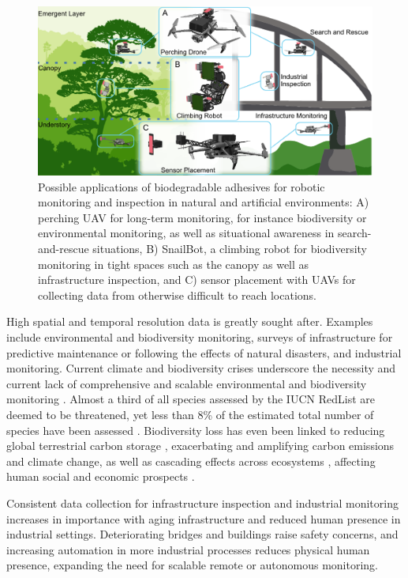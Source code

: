 \begin{figure}
  \includegraphics[width=\linewidth]{chapters/papers/SB/figures/fig-1-placeholder/fig-1-placeholder.pdf}
  \caption{Possible applications of biodegradable adhesives for robotic monitoring and inspection in natural and artificial environments: A) perching UAV for long-term monitoring, for instance biodiversity or environmental monitoring, as well as situational awareness in search-and-rescue situations, B) SnailBot, a climbing robot for biodiversity monitoring in tight spaces such as the canopy as well as infrastructure inspection, and C) sensor placement with UAVs for collecting data from otherwise difficult to reach locations.}
  \label{fig:fig1-placeholder}
\end{figure}


High spatial and temporal resolution data is greatly sought after. Examples include environmental and biodiversity monitoring, surveys of infrastructure for predictive maintenance or following the effects of natural disasters, and industrial monitoring. 
Current climate and biodiversity crises \cite{Pereira2024, Weiskopf2024, Pimm2014, Portner2023} underscore the necessity and current lack of comprehensive and scalable environmental and biodiversity monitoring \cite{Gonzalez2023a, McRae2017, Gonzalez2016, Mora2011}. 
Almost a third of all species assessed by the IUCN RedList are deemed to be threatened, yet less than 8\% of the estimated total number of species have been assessed \cite{IUCN2024}.
Biodiversity loss has even been linked to reducing global terrestrial carbon storage \cite{Weiskopf2024}, exacerbating and amplifying carbon emissions and climate change, as well as cascading effects across ecosystems \cite{Rosenberg2019, Ceballos2015}, affecting human social and economic prospects \cite{Frank2024, Portner2023}.

Consistent data collection for infrastructure inspection and industrial monitoring increases in importance with aging infrastructure and reduced human presence in industrial settings. Deteriorating bridges and buildings\cite{Lattanzi2017, Angst2018, Lee2023} raise safety concerns, and increasing automation in more industrial processes \cite{Jurkat2022} reduces physical human presence, expanding the need for scalable remote or autonomous monitoring. 



